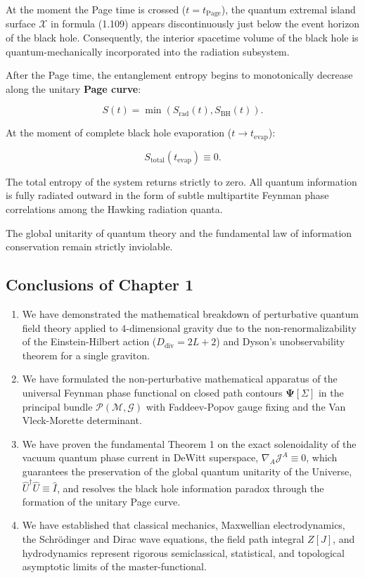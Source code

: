 At the moment the Page time is crossed ($t = t_{\text{Page}}$), the quantum extremal island surface $\mathcal{X}$ in formula (1.109) appears discontinuously just below the event horizon of the black hole. Consequently, the interior spacetime volume of the black hole is quantum-mechanically incorporated into the radiation subsystem.

After the Page time, the entanglement entropy begins to monotonically decrease along the unitary \textbf{Page curve}:

\begin{equation}\label{eq:1.121}\tag{1.121}
S(t) = \min\left( S_{\text{rad}}(t), S_{\text{BH}}(t) \right).
\end{equation}

At the moment of complete black hole evaporation ($t \to t_{\text{evap}}$):

\begin{equation}\label{eq:1.122}\tag{1.122}
S_{\text{total}}(t_{\text{evap}}) \equiv 0.
\end{equation}

The total entropy of the system returns strictly to zero. All quantum information is fully radiated outward in the form of subtle multipartite Feynman phase correlations among the Hawking radiation quanta.

The global unitarity of quantum theory and the fundamental law of information conservation remain strictly inviolable.

\subsection{Conclusions of Chapter 1}\label{sec:1.6}

\begin{enumerate}
\item We have demonstrated the mathematical breakdown of perturbative quantum field theory applied to 4-dimensional gravity due to the non-renormalizability of the Einstein-Hilbert action ($D_{\text{div}} = 2L + 2$) and Dyson's unobservability theorem for a single graviton.
\item We have formulated the non-perturbative mathematical apparatus of the universal Feynman phase functional on closed path contours $\mathbf{\Psi}[\Sigma]$ in the principal bundle $\mathcal{P}(\mathcal{M}, \mathcal{G})$ with Faddeev-Popov gauge fixing and the Van Vleck-Morette determinant.
\item We have proven the fundamental Theorem 1 on the exact solenoidality of the vacuum quantum phase current in DeWitt superspace, $\nabla_A \mathcal{J}^A \equiv 0$, which guarantees the preservation of the global quantum unitarity of the Universe, $\hat{U}^\dagger \hat{U} \equiv \hat{I}$, and resolves the black hole information paradox through the formation of the unitary Page curve.
\item We have established that classical mechanics, Maxwellian electrodynamics, the Schr\"odinger and Dirac wave equations, the field path integral $Z[J]$, and hydrodynamics represent rigorous semiclassical, statistical, and topological asymptotic limits of the master-functional.
\end{enumerate}
